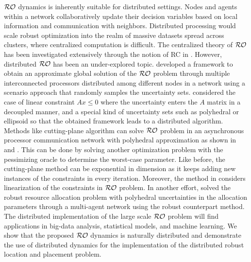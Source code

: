 \documentclass[journal,twoside,web]{ieeecolor}
\begin{document}
${\cal RO}$ dynamics is inherently suitable for distributed settings. Nodes and agents within a network collaboratively update their decision variables based on local information and communication with neighbors. Distributed processing would scale robust optimization into the realm of massive datasets spread across clusters, where centralized computation is difficult. The centralized theory of ${\cal RO}$ has been investigated extensively through the notion of RC in \cite{bental2009}. However, distributed ${\cal RO}$ has been an under-explored topic. \cite{tempo2019} developed a framework to obtain an approximate global solution of the ${\cal RO}$ problem through multiple interconnected processors distributed among different nodes in a network using a scenario approach that randomly samples the uncertainty sets. \cite{yang2014} considered the case of linear constraint $Ax \leq 0$ where the uncertainty enters the $A$ matrix in a decoupled manner, and a special kind of uncertainty sets such as polyhedral or ellipsoid so that the obtained framework leads to a distributed algorithm. Methods like cutting-plane algorithm can solve ${\cal RO}$ problem in an asynchronous processor communication network with polyhedral approximation as shown in \cite[Chapter~5]{burger2014} and \cite{burger2012}. This can be done by solving another optimization problem with the pessimizing oracle to determine the worst-case parameter. Like before, the cutting-plane method can be exponential in dimension as it keeps adding new instances of the constraints in every iteration. Moreover, the method in \cite{burger2012} considers linearization of the constraints in ${\cal RO}$ problem. In another effort, \cite{zeng2018} solved the robust resource allocation problem with polyhedral uncertainties in the allocation parameters through a multi-agent network using the robust counterpart method. The distributed implementation of the large scale ${\cal RO}$ problem will find applications in big-data analysis, statistical models, and machine learning. We show that the proposed ${\cal RO}$ dynamics is naturally distributed and demonstrate the use of distributed dynamics for the implementation of the distributed robust location and placement problem.
\end{document}
